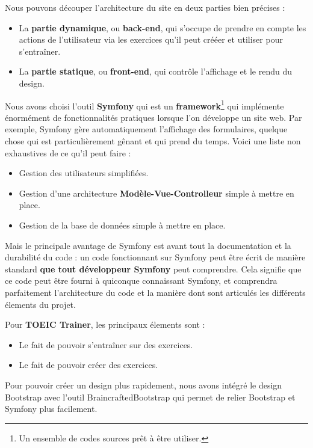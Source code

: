 \documentclass[12pt,a4paper]{report}
\begin{document}
Nous pouvons découper l'architecture du site en deux parties bien précises :
\begin{itemize}
	\item La \textbf{partie dynamique}, ou \textbf{back-end}, qui s'occupe de prendre en compte les actions
	 de l'utilisateur via les exercices qu'il peut crééer et utiliser pour
	 s'entra\^iner.
	 
	 \item La \textbf{partie statique}, ou \textbf{front-end}, qui contrôle l'affichage et le rendu du design.
\end{itemize}

Nous avons choisi l'outil \textbf{Symfony}\cite{Symfony} qui est un
\textbf{framework}\footnote{Un ensemble de codes sources pr\^et à \^etre utiliser.} qui implémente énormément de fonctionnalités pratiques
lorsque l'on développe un site web. Par exemple, Symfony gère automatiquement
l'affichage des formulaires, quelque chose qui est particulièrement g\^enant et
qui prend du temps. Voici une liste non exhaustives de ce qu'il peut faire :

\begin{itemize}
	\item Gestion des utilisateurs simplifiées.
	\item Gestion d'une architecture \textbf{Modèle-Vue-Controlleur} simple à
	mettre en place.
	\item Gestion de la base de données simple à mettre en place.
\end{itemize}

Mais le principale avantage de Symfony est avant tout la documentation et la
durabilité du code : un code fonctionnant sur Symfony peut être écrit de
manière standard \textbf{que tout développeur Symfony} peut comprendre. Cela
signifie que ce code peut être fourni à quiconque connaissant Symfony, et
comprendra parfaitement l'architecture du code et la manière dont sont
articulés les différents élements du projet.

Pour \textbf{TOEIC Trainer}, les principaux élements sont :

\begin{itemize}
	\item Le fait de pouvoir s'entraîner sur des exercices.
	\item Le fait de pouvoir créer des exercices.
\end{itemize}

Pour pouvoir créer un design plus rapidement, nous avons intégré le design Bootstrap\cite{Bootstrap} avec l'outil BraincraftedBootstrap\cite{BraincraftedBootstrapBundle} qui permet de relier Bootstrap et Symfony plus facilement.
\end{document}
